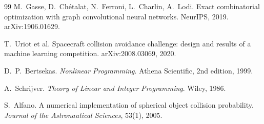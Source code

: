 \documentclass[11pt]{article}
\theoremstyle{definition}
\theoremstyle{remark}
\begin{document}
\begin{thebibliography}{99}
 M.~Gasse, D.~Ch\'etalat, N.~Ferroni, L.~Charlin, A.~Lodi.
\newblock Exact combinatorial optimization with graph convolutional neural networks.
\newblock NeurIPS, 2019. arXiv:1906.01629.

 T.~Uriot et al.
\newblock Spacecraft collision avoidance challenge: design and results of a machine learning competition.
\newblock arXiv:2008.03069, 2020.

 D.~P.~Bertsekas.
\newblock \emph{Nonlinear Programming}. Athena Scientific, 2nd edition, 1999.

 A.~Schrijver.
\newblock \emph{Theory of Linear and Integer Programming}. Wiley, 1986.

 S.~Alfano.
\newblock A numerical implementation of spherical object collision probability.
\newblock \emph{Journal of the Astronautical Sciences}, 53(1), 2005.

\end{thebibliography}
\end{document}
